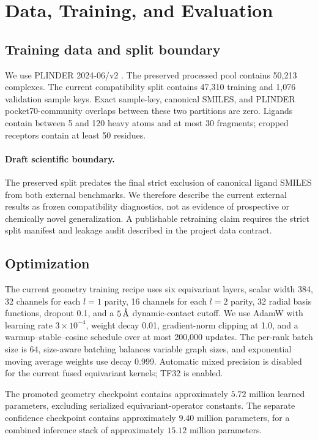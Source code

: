 \section{Data, Training, and Evaluation}
\label{sec:experiments}

\subsection{Training data and split boundary}

We use PLINDER 2024-06/v2 \citep{durairaj2024plinder}. The preserved processed
pool contains 50,213 complexes. The current compatibility split contains
47,310 training and 1,076 validation sample keys. Exact sample-key, canonical
SMILES, and PLINDER pocket70-community overlaps between these two partitions
are zero. Ligands contain between 5 and 120 heavy atoms and at most 30
fragments; cropped receptors contain at least 50 residues.

\paragraph{Draft scientific boundary.}
The preserved split predates the final strict exclusion of canonical ligand
SMILES from both external benchmarks. We therefore describe the current
external results as frozen compatibility diagnostics, not as evidence of
prospective or chemically novel generalization. A publishable retraining claim
requires the strict split manifest and leakage audit described in the project
data contract.

\subsection{Optimization}

The current geometry training recipe uses six equivariant layers, scalar width
384, 32 channels for each \(l=1\) parity, 16 channels for each \(l=2\)
parity, 32 radial basis functions, dropout 0.1, and a \(5\,\text{\normalfont\AA}\)
dynamic-contact cutoff. We use AdamW with learning rate \(3\times10^{-4}\),
weight decay 0.01, gradient-norm clipping at 1.0, and a warmup--stable--cosine
schedule over at most 200,000 updates. The per-rank batch size is 64,
size-aware batching balances variable graph sizes, and exponential moving
average weights use decay 0.999. Automatic mixed precision is disabled for the
current fused equivariant kernels; TF32 is enabled.

The promoted geometry checkpoint contains approximately \(5.72\) million
learned parameters, excluding serialized equivariant-operator constants. The
separate confidence checkpoint contains approximately \(9.40\) million
parameters, for a combined inference stack of approximately \(15.12\) million
parameters.

